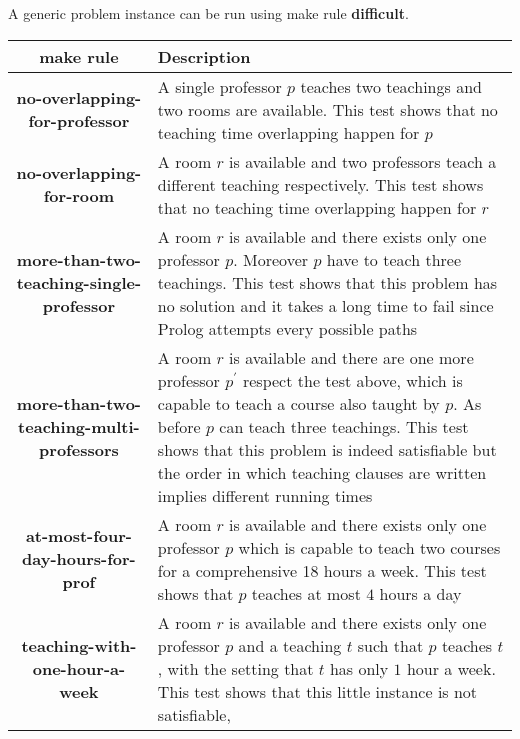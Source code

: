 \documentclass[10pt,a4paper]{article} %
\begin{document}
    A generic problem instance can be run using make rule \textbf{difficult}.

    \begin{table}
        \label{table:test-cases}
        \begin{tabular}{ c | p{6cm} }
            make rule & Description  \\
            \hline
            \textbf{no-overlapping-for-professor} & A single professor $p$
                teaches two teachings and two rooms are available.
                This test shows that no teaching time overlapping happen for $p$ \\
            \hline
            \textbf{no-overlapping-for-room} & A room $r$ is available and two
                professors teach a different teaching respectively.
                This test shows that no teaching time overlapping happen for $r$  \\
            \hline
            \textbf{more-than-two-teaching-single-professor} & A room $r$ is available and
                there exists only one professor $p$. Moreover $p$ have to teach three teachings.
                This test shows that this problem has no solution and it takes
                a long time to fail since Prolog attempts every possible paths \\
            \hline
            \textbf{more-than-two-teaching-multi-professors} & A room $r$ is available and
                there are one more professor $p^\prime$ respect the test above,
                which is capable to teach a course also taught by $p$.
                As before $p$ can teach three teachings.
                This test shows that this problem is indeed satisfiable but
                the order in which teaching clauses are written implies different
                running times \\
            \hline
            \textbf{at-most-four-day-hours-for-prof} & A room $r$ is available and
                there exists only one professor $p$
                which is capable to teach two courses for a comprehensive 18 hours
                a week. This test shows that $p$ teaches at most $4$ hours a day\\
            \hline
            \textbf{teaching-with-one-hour-a-week} & A room $r$ is available and
                there exists only one professor $p$ and a teaching $t$ such that
                $p$ teaches $t$, with the setting that $t$ has only $1$ hour a week.
                This test shows that this little instance is not satisfiable,

\end{tabular}
\end{table}
\end{document}

